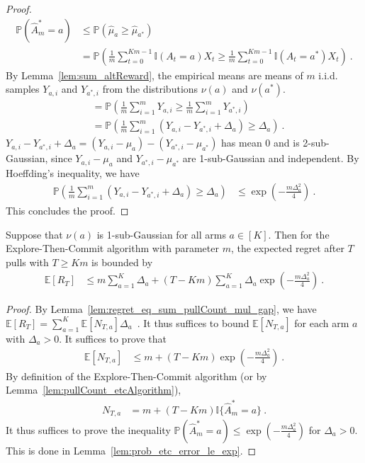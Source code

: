 \begin{proof}
\begin{align*}
  \mathbb{P}(\hat{A}_m^* = a)
  &\le \mathbb{P}(\hat{\mu}_a \ge \hat{\mu}_{a^*})
  \\
  &= \mathbb{P}\left(\frac{1}{m} \sum_{t=0}^{Km-1} \mathbb{I}(A_t = a) X_t \ge \frac{1}{m} \sum_{t=0}^{Km-1} \mathbb{I}(A_t = a^*) X_t\right)
  \: .
\end{align*}
By Lemma~\ref{lem:sum_altReward}, the empirical means are means of $m$ i.i.d. samples $Y_{a,i}$ and $Y_{a^*,i}$ from the distributions $\nu(a)$ and $\nu(a^*)$.
\begin{align*}
  &= \mathbb{P}\left(\frac{1}{m} \sum_{i=1}^m Y_{a,i} \ge \frac{1}{m} \sum_{i=1}^m Y_{a^*,i}\right)
  \\
  &= \mathbb{P}\left(\frac{1}{m} \sum_{i=1}^m (Y_{a,i} - Y_{a^*,i} + \Delta_a) \ge \Delta_a\right)
  \: .
\end{align*}
$Y_{a,i} - Y_{a^*,i} + \Delta_a = (Y_{a,i} - \mu_a) - (Y_{a^*,i} - \mu_{a^*})$ has mean 0 and is 2-sub-Gaussian, since $Y_{a,i}-\mu_a$ and $Y_{a^*,i} - \mu_{a^*}$ are 1-sub-Gaussian and independent.
By Hoeffding's inequality, we have
\begin{align*}
  \mathbb{P}\left(\frac{1}{m} \sum_{i=1}^m (Y_{a,i} - Y_{a^*,i} + \Delta_a) \ge \Delta_a\right)
  &\le \exp\left(- \frac{m \Delta_a^2}{4}\right)
  \: .
\end{align*}
This concludes the proof.
\end{proof}


\begin{theorem}\label{thm:regret_etc_le}
Suppose that $\nu(a)$ is 1-sub-Gaussian for all arms $a \in [K]$.
Then for the Explore-Then-Commit algorithm with parameter $m$, the expected regret after $T$ pulls with $T \ge Km$ is bounded by
\begin{align*}
  \mathbb{E}[R_T]
  &\le m \sum_{a=1}^K \Delta_a + (T - Km) \sum_{a=1}^K \Delta_a \exp\left(- \frac{m \Delta_a^2}{4}\right)
  \: .
\end{align*}
\end{theorem}

\begin{proof}
By Lemma~\ref{lem:regret_eq_sum_pullCount_mul_gap}, we have $\mathbb{E}[R_T] = \sum_{a=1}^K \mathbb{E}\left[N_{T,a}\right] \Delta_a$~.
It thus suffices to bound $\mathbb{E}[N_{T,a}]$ for each arm $a$ with $\Delta_a > 0$.
It suffices to prove that
\begin{align*}
  \mathbb{E}[N_{T,a}]
  &\le m + (T - Km) \exp\left(- \frac{m \Delta_a^2}{4}\right)
  \: .
\end{align*}
By definition of the Explore-Then-Commit algorithm (or by Lemma~\ref{lem:pullCount_etcAlgorithm}),
\begin{align*}
  N_{T,a}
  &= m + (T - Km) \mathbb{I}\{\hat{A}_m^* = a\}
  \: .
\end{align*}
It thus suffices to prove the inequality $\mathbb{P}(\hat{A}_m^* = a) \le \exp\left(- \frac{m \Delta_a^2}{4}\right)$ for $\Delta_a > 0$.
This is done in Lemma~\ref{lem:prob_etc_error_le_exp}.
\end{proof}
